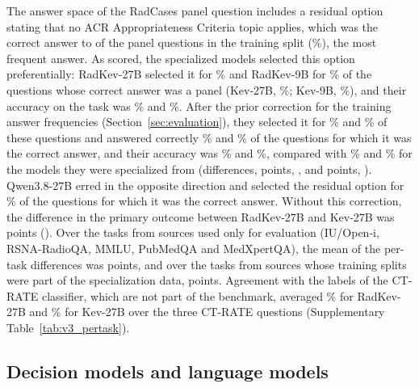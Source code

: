 The answer space of the RadCases panel question includes a residual option stating that no ACR Appropriateness Criteria topic applies, which was the correct answer to  of the  panel questions in the training split (\%), the most frequent answer. As scored, the specialized models selected this option preferentially: RadKev-27B selected it for \% and RadKev-9B for \% of the  questions whose correct answer was a panel (Kev-27B, \%; Kev-9B, \%), and their accuracy on the task was \% and \%. After the prior correction for the training answer frequencies (Section~\ref{sec:evaluation}), they selected it for \% and \% of these questions and answered correctly \% and \% of the  questions for which it was the correct answer, and their accuracy was \% and \%, compared with \% and \% for the models they were specialized from (differences,  points, , and  points, ). Qwen3.8-27B erred in the opposite direction and selected the residual option for \% of the questions for which it was the correct answer. %
Without this correction, the difference in the primary outcome between RadKev-27B and Kev-27B was  points (). %
Over the  tasks from sources used only for evaluation (IU/Open-i, RSNA-RadioQA, MMLU, PubMedQA and MedXpertQA), the mean of the per-task differences was  points, and over the  tasks from sources whose training splits were part of the specialization data,  points.
Agreement with the labels of the CT-RATE classifier, which are not part of the benchmark, averaged \% for RadKev-27B and \% for Kev-27B over the three CT-RATE questions (Supplementary Table~\ref{tab:v3_pertask}).

\FloatBarrier
\subsection{Decision models and language models}\label{sec:res_llm}

